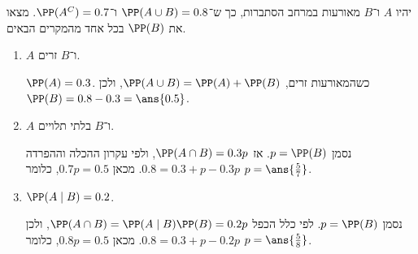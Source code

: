 יהיו $A$ ו־$B$ מאורעות במרחב הסתברות, כך ש־$\PP(A\cup B)=0.8$ ו־$\PP(A^C)=0.7$. מצאו את $\PP(B)$ בכל אחד מהמקרים הבאים.
\begin{enumerate}
\item $A$ ו־$B$ זרים.
\begin{solbox}
$\PP(A)=0.3$. כשהמאורעות זרים, $\PP(A\cup B)=\PP(A)+\PP(B)$, ולכן $\PP(B)=0.8-0.3=\ans{0.5}$.
\end{solbox}
\item $A$ ו־$B$ בלתי תלויים.
\begin{solbox}
נסמן $p=\PP(B)$. אז $\PP(A\cap B)=0.3p$, ולפי עקרון ההכלה וההפרדה $0.8=0.3+p-0.3p$. מכאן $0.7p=0.5$, כלומר $p=\ans{\frac57}$.
\end{solbox}
\item $\PP(A\mid B)=0.2$.
\begin{solbox}
נסמן $p=\PP(B)$. לפי כלל הכפל $\PP(A\cap B)=\PP(A\mid B)\PP(B)=0.2p$, ולכן $0.8=0.3+p-0.2p$. מכאן $0.8p=0.5$, כלומר $p=\ans{\frac58}$.
\end{solbox}
\end{enumerate}
